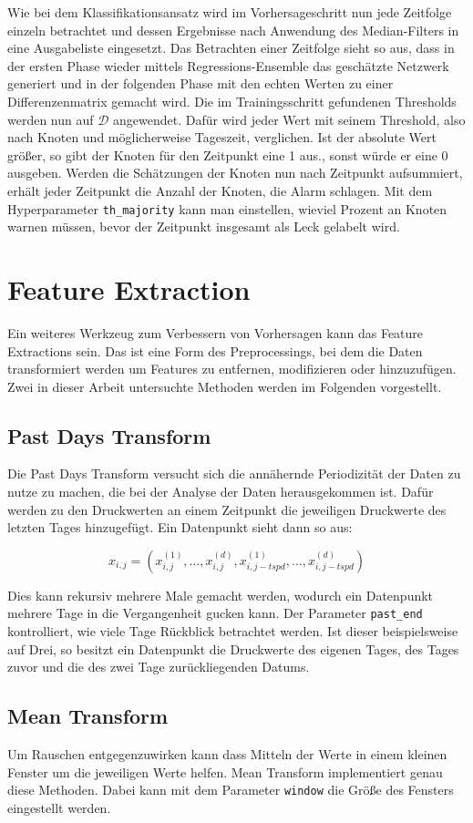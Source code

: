 Wie bei dem Klassifikationsansatz wird im Vorhersageschritt nun jede Zeitfolge einzeln betrachtet und dessen
 Ergebnisse nach Anwendung des Median-Filters in eine Ausgabeliste eingesetzt. Das Betrachten einer Zeitfolge
 sieht so aus, dass in der ersten Phase wieder mittels Regressions-Ensemble das geschätzte Netzwerk generiert
 und in der folgenden Phase mit den echten Werten zu einer Differenzenmatrix gemacht wird. Die im Trainingsschritt
 gefundenen Thresholds werden nun auf $\mathcal{D}$ angewendet. Dafür wird jeder Wert mit seinem Threshold,
 also nach Knoten und möglicherweise Tageszeit, verglichen. Ist der absolute Wert größer, so gibt der Knoten für
 den Zeitpunkt eine 1 aus., sonst würde er eine 0 ausgeben. Werden die Schätzungen der Knoten nun nach Zeitpunkt
 aufsummiert, erhält jeder Zeitpunkt die Anzahl der Knoten, die Alarm schlagen. Mit dem Hyperparameter
 \texttt{th\_majority} kann man einstellen, wieviel Prozent an Knoten warnen müssen, bevor der Zeitpunkt insgesamt
 als Leck gelabelt wird.

\section{Feature Extraction}

Ein weiteres Werkzeug zum Verbessern von Vorhersagen kann das Feature Extractions sein. Das ist eine Form des
 Preprocessings, bei dem die Daten transformiert werden um Features zu entfernen, modifizieren oder hinzuzufügen.
 Zwei in dieser Arbeit untersuchte Methoden werden im Folgenden vorgestellt.

\subsection*{Past Days Transform}

Die Past Days Transform versucht sich die annähernde Periodizität der Daten zu nutze zu machen, die bei
der Analyse der Daten herausgekommen ist. Dafür werden zu den Druckwerten an einem Zeitpunkt die jeweiligen
Druckwerte des letzten Tages hinzugefügt. Ein Datenpunkt sieht dann so aus:

\begin{equation*}
    x_{i, j} = (x_{i, j}^{(1)}, …, x_{i, j}^{(d)}, x_{i, j-tspd}^{(1)}, …, x_{i, j-tspd}^{(d)})
\end{equation*}

Dies kann rekursiv mehrere Male gemacht werden, wodurch ein Datenpunkt mehrere Tage in die Vergangenheit
 gucken kann. Der Parameter \texttt{past\_end} kontrolliert, wie viele Tage Rückblick betrachtet werden. Ist
 dieser beispielsweise auf Drei, so besitzt ein Datenpunkt die Druckwerte des eigenen Tages, des Tages
 zuvor und die des zwei Tage zurückliegenden Datums.

\subsection*{Mean Transform}

Um Rauschen entgegenzuwirken kann dass Mitteln der Werte in einem kleinen Fenster um die jeweiligen Werte helfen.
 Mean Transform implementiert genau diese Methoden. Dabei kann mit dem Parameter \texttt{window} die Größe des
 Fensters eingestellt werden.
